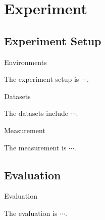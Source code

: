 \section{Experiment}\label{sec:Experiment}

\subsection{Experiment Setup}\label{subsec:experiment-setup}

\begin{frame}{Environments}

    The experiment setup is $\cdots$.

\end{frame}

\begin{frame}{Datasets}

    The datasets include $\cdots$.

\end{frame}

\begin{frame}{Measurement}

    The measurement is $\cdots$.

\end{frame}

\subsection{Evaluation}\label{subsec:Evaluation}

\begin{frame}{Evaluation}

    The evaluation is $\cdots$.

\end{frame}
